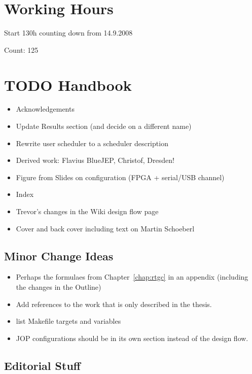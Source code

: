 \section{Working Hours}

Start 130h counting down from 14.9.2008

Count: 125

\section{TODO Handbook}

\begin{itemize}
    \item Acknowledgements
    \item Update Results section (and decide on a different name)
    \item Rewrite user scheduler to a scheduler description
    \item Derived work: Flavius BlueJEP, Christof, Dresden!
    \item Figure from Slides on configuration (FPGA + serial/USB
    channel)
    \item Index
    \item Trevor's changes in the Wiki design flow page
    \item Cover and back cover including text on Martin Schoeberl
\end{itemize}

\subsection{Minor Change Ideas}

\begin{itemize}
  \item Perhaps the formulaes from Chapter~\ref{chap:rtgc} in an
      appendix (including the changes in the Outline)
  \item Add references to the work that is only described in the
      thesis.
  \item list Makefile targets and variables
  \item JOP configurations should be in its own section instead
      of the design flow.
\end{itemize}

\subsection{Editorial Stuff}

